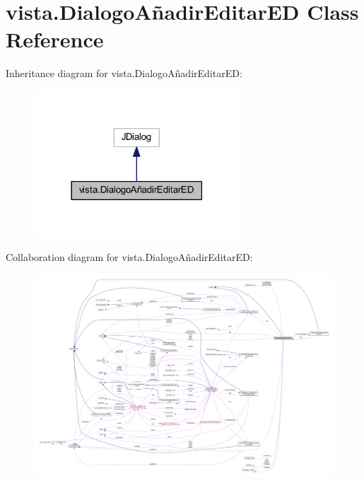 \hypertarget{classvista_1_1_dialogo_a_xC3_xB1adir_editar_e_d}{}\section{vista.\+Dialogo\+Añadir\+Editar\+ED Class Reference}
\label{classvista_1_1_dialogo_a_xC3_xB1adir_editar_e_d}


Inheritance diagram for vista.\+Dialogo\+Añadir\+Editar\+ED\+:
\nopagebreak
\begin{figure}[H]
\begin{center}
\leavevmode
\includegraphics[width=218pt]{classvista_1_1_dialogo_a_xC3_xB1adir_editar_e_d__inherit__graph}
\end{center}
\end{figure}


Collaboration diagram for vista.\+Dialogo\+Añadir\+Editar\+ED\+:
\nopagebreak
\begin{figure}[H]
\begin{center}
\leavevmode
\includegraphics[width=350pt]{classvista_1_1_dialogo_a_xC3_xB1adir_editar_e_d__coll__graph}
\end{center}
\end{figure}
